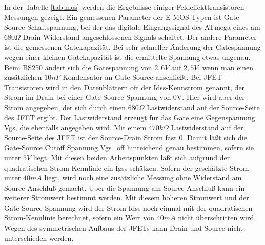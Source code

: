 In der Tabelle \ref{tab:mos} werden die Ergebnisse einiger Feldeffekttransistoren-Messungen gezeigt.
Ein gemessenen Parameter der E-MOS-Typen ist Gate-Source-Schaltspannung,
bei der das digitale Eingangssignal des ATmega eines am \(680\Omega\) Drain-Widerstand 
angeschlossenen Signals schaltet.
Der andere Parameter ist die gemessenen Gatekapazität.
Bei sehr schneller Änderung der Gatespannung wegen einer kleinen Gatekapazität 
ist die ermittelte Spannung etwas ungenau.
Beim BS250 ändert sich die Gatespannung von \(2,6V\) auf \(2,5V\), wenn man einen zusätzlichen
\(10nF\) Kondensator an Gate-Source anschließt.
Bei JFET-Transistoren wird in den Datenblättern oft der Idss-Kennstrom genannt,
der Strom im Drain bei einer Gate-Source-Spannung von 0V.
Hier wird aber der Strom angegeben, der sich durch einen \(680\Omega\) Lastwiderstand auf der
Source-Seite des JFET ergibt.
Der Lastwiderstand erzeugt für das Gate eine Gegenspannung Vgs,
die ebenfalls angegeben wird.
Mit einem \(470k\Omega\) Lastwiderstand auf der Source-Seite des JFET ist der Source-Drain Strom
fast 0. Damit läßt sich die Gate-Source Cutoff Spannung Vgs\_off hinreichend genau bestimmen,
sofern sie unter \(5V\) liegt.
Mit diesen beiden Arbeitspunkten läßt sich aufgrund der quadratischen Strom-Kennlinie ein Igss
schätzen. Sofern der geschätzte Strom unter \(40mA\) liegt, wird noch eine zusätzliche Messung
ohne Widerstand am Source Anschluß gemacht. 
Über die Spannung am Source-Anschluß kann ein weiterer Stromwert bestimmt werden. 
Mit diesem höheren Stromwert und der Gate-Source Spannung wird der Strom Idss noch einmal mit
der quadratischen Strom-Kennlinie berechnet, sofern ein Wert von \(40mA\) nicht überschritten wird.
Wegen des symmetrischen Aufbaus der JFETs kann Drain und Source nicht unterschieden werden.

